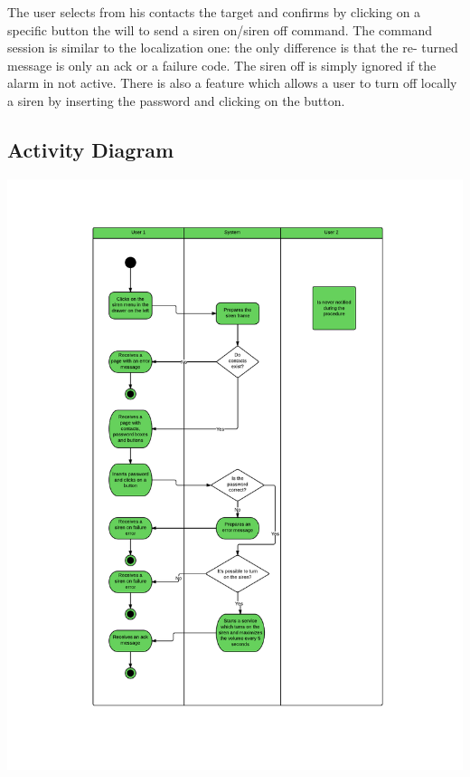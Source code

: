 The user selects from his contacts the target and confirms by clicking on a
specific button the will to send a siren on/siren off command. The command
session is similar to the localization one: the only difference is that the re-
turned message is only an ack or a failure code. The siren off is simply ignored
if the alarm in not active. There is also a feature which allows a user to turn
off locally a siren by inserting the password and clicking on the button.

\newpage
\subsection{Activity Diagram}

\includegraphics[scale=0.7]{images/SirenOn}
\newpage
